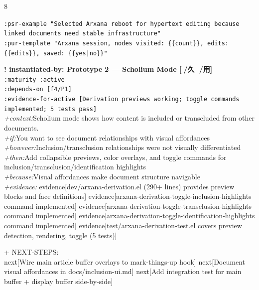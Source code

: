 \documentclass[landscape]{article}
\newcommand{\flexitag}[1]{\textcolor[gray]{0.35}{\textit{#1}}}
\newenvironment{devmapactive}{%
  \def\FrameCommand{\colorbox{devmapactivebg}}%
  \setlength{\fboxsep}{2pt}%
  \MakeFramed{\advance\hsize-\width \FrameRestore}%
}{\endMakeFramed}
\newenvironment{devmapsettled}{%
  \def\FrameCommand{\colorbox{devmapsettledbg}}%
  \setlength{\fboxsep}{2pt}%
  \MakeFramed{\advance\hsize-\width \FrameRestore}%
}{\endMakeFramed}
\begin{document}
\begin{paracol}{8}
\begin{devmapsettled}
\par
  \texttt{:\allowbreak{}psr-\allowbreak{}example "Selected Arxana reboot for hypertext editing because linked documents need stable infrastructure"}\\
  \texttt{:\allowbreak{}pur-\allowbreak{}template "Arxana session,\allowbreak{} nodes visited:\allowbreak{} \{\{count\}\},\allowbreak{} edits:\allowbreak{} \{\{edits\}\},\allowbreak{} saved:\allowbreak{} \{\{yes|\allowbreak{}no\}\}"}\\
\par
\par
\end{devmapsettled}
\begin{devmapactive}
\textbf{! instantiated-by: Prototype 2 — Scholium Mode [🐲/久 🙅/用]}\\
  \texttt{:\allowbreak{}maturity :\allowbreak{}active}\\
  \texttt{:\allowbreak{}depends-\allowbreak{}on [f4/\allowbreak{}P1]}\\
  \texttt{:\allowbreak{}evidence-\allowbreak{}for-\allowbreak{}active [Derivation previews working;\allowbreak{} toggle commands implemented;\allowbreak{} 5 tests pass]}\\
  \flexitag{+context:}Scholium mode shows how content is included or transcluded from other documents.\\
  \flexitag{+if:}You want to see document relationships with visual affordances\\
  \flexitag{+however:}Inclusion/transclusion relationships were not visually differentiated\\
  \flexitag{+then:}Add collapsible previews, color overlays, and toggle commands for inclusion/transclusion/identification highlights\\
  \flexitag{+because:}Visual affordances make document structure navigable\\
  \flexitag{+evidence:} evidence[dev/arxana-derivation.el (290+ lines) provides preview blocks and face definitions] evidence[arxana-derivation-toggle-inclusion-highlights command implemented] evidence[arxana-derivation-toggle-transclusion-highlights command implemented] evidence[arxana-derivation-toggle-identification-highlights command implemented] evidence[test/arxana-derivation-test.el covers preview detection, rendering, toggle (5 tests)]\\
\par
  + NEXT-STEPS:\\
    next[Wire main article buffer overlays to mark-things-up hook] next[Document visual affordances in docs/inclusion-ui.md] next[Add integration test for main buffer + display buffer side-by-side]\\

\end{devmapactive}
\end{paracol}
\end{document}
